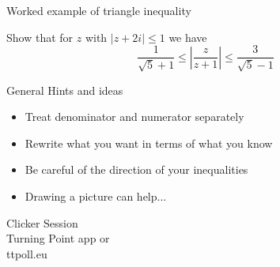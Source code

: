 \documentclass{beamer}
\begin{document}
\begin{frame}{Worked example of triangle inequality}


Show that for $z$ with $|z+2i|\leq 1$ we have
$$\frac{1}{\sqrt{5}+1}\leq \left|\frac{z}{z+1}\right| \leq \frac{3}{\sqrt{5}-1}$$  
 
\begin{block}{General Hints and ideas} 
 \begin{itemize}
     \item Treat denominator and numerator separately
     \item Rewrite what you want in terms of what you know
     \item Be careful of the direction of your inequalities
     \item Drawing a picture can help...
 \end{itemize}
 
 
 \end{block} 
  \end{frame}

\begin{frame}
  
\begin{center}

\Huge

Clicker Session \\
Turning Point app or \\
ttpoll.eu 

\end{center}

\end{frame}
\end{document}
